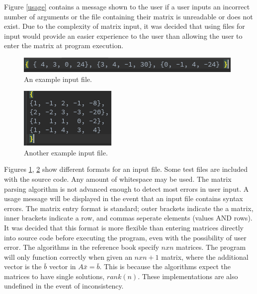 \documentclass[12pt]{article}
\begin{document}
Figure \ref{usage} contains a message shown to the user if a user inputs an incorrect
number of arguments or the file containing their matrix is unreadable or does not 
exist. Due to the complexity of matrix input, it was decided that using files for 
input would provide an easier experience to the user than allowing the user to 
enter the matrix at program execution.

\begin{figure}[H]
\begin{center}
\includegraphics{input1.png}
\caption{An example input file.}
\label{input1}
\end{center}
\end{figure}
\begin{figure}[H]
\begin{center}
\includegraphics{input2.png}
\caption{Another example input file.}
\label{input2}
\end{center}
\end{figure}

Figures \ref{input1}, \ref{input2} show different formats for an input file. Some
test files are included with the source code. Any amount of whitespace may be used.
The matrix parsing algorithm is not advanced enough to detect most errors in user
input. A usage message will be displayed in the event that an input file contains
syntax errors. The matrix entry format is standard; outer brackets indicate the 
a matrix, inner brackets indicate a row, and commas seperate elements 
(values AND rows).  It was decided that this format is more flexible than entering
matrices directly into source code before executing the program, even with the
possibility of user error. The algorithms in the reference book specify $n x n$ 
matrices. The program will only function correctly when given an $n x n + 1$ 
matrix, where the additional vector is the $\bar{b}$ vector in $A\bar{x} = \bar{b}$.
This is because the algorithms expect the matrices to have single solutions,
$rank(n)$.
These implementations are also undefined in the event of inconsistency.
\end{document}
